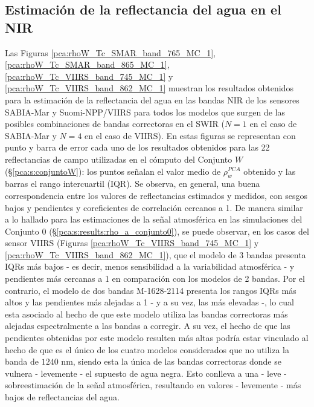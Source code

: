     \subsection{Estimación de la reflectancia del agua en el NIR}
    \label{pca:s:resultados:rhow}

        Las Figuras \ref{pca:rhoW_Tc_SMAR_band_765_MC_1}, \ref{pca:rhoW_Tc_SMAR_band_865_MC_1}, \ref{pca:rhoW_Tc_VIIRS_band_745_MC_1} y \ref{pca:rhoW_Tc_VIIRS_band_862_MC_1} muestran los resultados obtenidos para la estimación de la reflectancia del agua en las bandas NIR de los sensores SABIA-Mar y Suomi-NPP/VIIRS para todos los modelos que surgen de las posibles combinaciones de bandas correctoras en el SWIR ($N=1$ en el caso de SABIA-Mar y $N=4$ en el caso de VIIRS). En estas figuras se representan con punto y barra de error cada uno de los resultados obtenidos para las 22 reflectancias de campo utilizadas en el cómputo del Conjunto $W$ (\S \ref{pca:s:conjuntoW}): los puntos señalan el valor medio de $\rho_{w}^{PCA}$ obtenido y las barras el rango intercuartil (IQR). Se observa, en general, una buena correspondencia entre los valores de reflectancias estimados y medidos, con sesgos bajos y pendientes y coreficientes de correlación cercanos a 1. De manera similar a lo hallado para las estimaciones de la señal atmosférica en las simulaciones del Conjunto $0$ (\S \ref{pca:s:results:rho_a_conjunto0}), se puede observar, en los casos del sensor VIIRS (Figuras \ref{pca:rhoW_Tc_VIIRS_band_745_MC_1} y \ref{pca:rhoW_Tc_VIIRS_band_862_MC_1}), que el modelo de 3 bandas presenta IQRs más bajos - es decir, menos sensibilidad a la variabilidad atmosférica - y pendientes más cercanas a 1 en comparación con los modelos de 2 bandas. Por el contrario, el modelo de dos bandas M-1628-2114 presenta los rangos IQRs más altos y las pendientes más alejadas a 1 - y a su vez, las más elevadas -, lo cual esta asociado al hecho de que este modelo utiliza las bandas correctoras más alejadas espectralmente a las bandas a corregir. A su vez, el hecho de que las pendientes obtenidas por este modelo resulten más altas podría estar vinculado al hecho de que es el único de los cuatro modelos considerados que no utiliza la banda de $1240$ nm, siendo esta la única de las bandas correctoras donde se vulnera - levemente - el supuesto de agua negra. Esto conlleva a una - leve - sobreestimación de la señal atmosférica, resultando en valores - levemente - más bajos de reflectancias del agua. 

